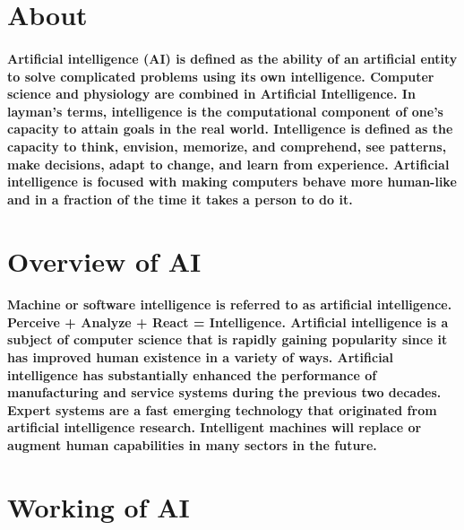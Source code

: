 \documentclass{article}
\begin{document}
	\section{About}
	\paragraph{Artificial intelligence (AI) is defined as the ability of an artificial entity to solve complicated problems using its own intelligence. Computer science and physiology are combined in Artificial Intelligence. In layman's terms, intelligence is the computational component of one's capacity to attain goals in the real world. Intelligence is defined as the capacity to think, envision, memorize, and comprehend, see patterns, make decisions, adapt to change, and learn from experience. Artificial intelligence is focused with making computers behave more human-like and in a fraction of the time it takes a person to do it.}
	\section{Overview of AI}
	\paragraph{Machine or software intelligence is referred to as artificial intelligence. Perceive + Analyze + React = Intelligence. Artificial intelligence is a subject of computer science that is rapidly gaining popularity since it has improved human existence in a variety of ways. Artificial intelligence has substantially enhanced the performance of manufacturing and service systems during the previous two decades. Expert systems are a fast emerging technology that originated from artificial intelligence research. Intelligent machines will replace or augment human capabilities in many sectors in the future. }

\newpage
	\section{Working of AI}
\end{document}
